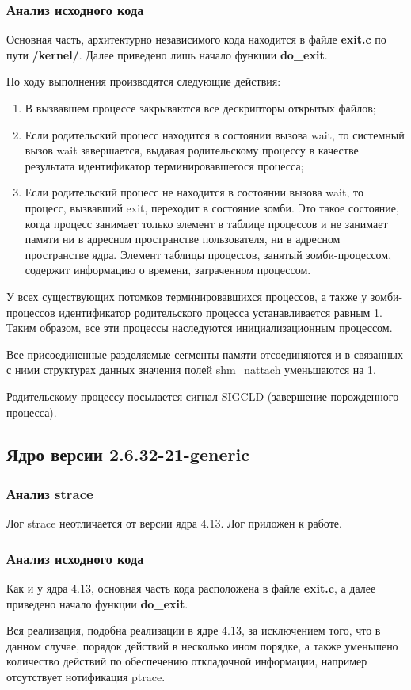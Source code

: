 \subsubsection{Анализ исходного кода}
Основная часть, архитектурно независимого кода находится в файле \textbf{exit.c} по пути \textbf{/kernel/}. Далее приведено лишь начало функции \textbf{do\_exit}.

По ходу выполнения производятся следующие действия:
\begin{enumerate}
\item В вызвавшем процессе закрываются все дескрипторы открытых файлов;
\item Если родительский процесс находится в состоянии вызова wait, то системный вызов wait завершается, выдавая родительскому процессу в качестве результата идентификатор терминировавшегося процесса;
\item Если родительский процесс не находится в состоянии вызова wait, то процесс, вызвавший exit, переходит в состояние зомби. Это такое состояние, когда процесс занимает только элемент в таблице процессов и не занимает памяти ни в адресном пространстве пользователя, ни в адресном пространстве ядра. Элемент таблицы процессов, занятый зомби-процессом, содержит информацию о времени, затраченном процессом.
\end{enumerate}
У всех существующих потомков терминировавшихся процессов, а также у зомби-процессов идентификатор родительского процесса устанавливается равным 1. Таким образом, все эти процессы наследуются инициализационным процессом.

Все присоединенные разделяемые сегменты памяти отсоединяются и в связанных с ними структурах данных значения полей shm\_nattach уменьшаются на 1.

Родительскому процессу посылается сигнал SIGCLD (завершение порожденного процесса).

\subsection{Ядро версии 2.6.32-21-generic}
\subsubsection{Анализ strace}
Лог strace неотличается от версии ядра 4.13. Лог приложен к работе.
\subsubsection{Анализ исходного кода}
Как и у ядра 4.13, основная часть кода расположена в файле \textbf{exit.c}, а далее приведено начало функции \textbf{do\_exit}.

Вся реализация, подобна реализации в ядре 4.13, за исключением того, что в данном случае, порядок действий в несколько ином порядке, а также уменьшено количество действий по обеспечению откладочной информации, например отсутствует нотификация ptrace.

